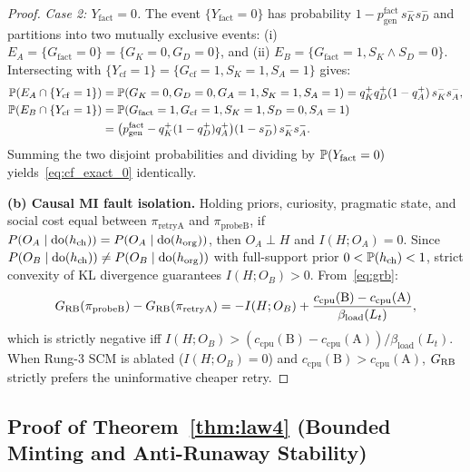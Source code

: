 \begin{proof}
\emph{Case 2: $Y_{\mathrm{fact}} = 0$.} The event $\{Y_{\mathrm{fact}} = 0\}$ has probability $1 - p_{\mathrm{gen}}^{\mathrm{fact}}\, s_K^- s_D^-$ and partitions into two mutually exclusive events:
(i) $E_A = \{G_{\mathrm{fact}} = 0\} = \{G_K = 0, G_D = 0\}$, and
(ii) $E_B = \{G_{\mathrm{fact}} = 1, S_K \land S_D = 0\}$.
Intersecting with $\{Y_{\mathrm{cf}} = 1\} = \{G_{\mathrm{cf}} = 1, S_K = 1, S_A = 1\}$ gives:
\begin{align*}
  \mathbb{P}(E_A \cap \{Y_{\mathrm{cf}}=1\}) &= \mathbb{P}(G_K=0, G_D=0, G_A=1, S_K=1, S_A=1) = q_K^+ q_D^+ (1 - q_A^+)\, s_K^- s_A^-,\\
  \mathbb{P}(E_B \cap \{Y_{\mathrm{cf}}=1\}) &= \mathbb{P}(G_{\mathrm{fact}}=1, G_{\mathrm{cf}}=1, S_K=1, S_D=0, S_A=1)\\
  &= \big(p_{\mathrm{gen}}^{\mathrm{fact}} - q_K^+(1-q_D^+)q_A^+\big)(1 - s_D^-)\, s_K^- s_A^-.
\end{align*}
Summing the two disjoint probabilities and dividing by $\mathbb{P}(Y_{\mathrm{fact}} = 0)$ yields~\eqref{eq:cf_exact_0} identically.

\textbf{(b) Causal MI fault isolation.}
Holding priors, curiosity, pragmatic state, and social cost equal between $\pi_{\mathrm{retryA}}$ and $\pi_{\mathrm{probeB}}$, if $P(O_A \mid \operatorname{do}(h_{\mathrm{ch}})) = P(O_A \mid \operatorname{do}(h_{\mathrm{org}}))$, then $O_A \perp H$ and $I(H; O_A) = 0$. Since $P(O_B \mid \operatorname{do}(h_{\mathrm{ch}})) \neq P(O_B \mid \operatorname{do}(h_{\mathrm{org}}))$ with full-support prior $0 < \mathbb{P}(h_{\mathrm{ch}}) < 1$, strict convexity of KL divergence guarantees $I(H; O_B) > 0$. From~\eqref{eq:grb}:
\[
  G_{\mathrm{RB}}(\pi_{\mathrm{probeB}}) - G_{\mathrm{RB}}(\pi_{\mathrm{retryA}}) = -I(H; O_B) + \frac{c_{\mathrm{cpu}}(\mathrm{B}) - c_{\mathrm{cpu}}(\mathrm{A})}{\beta_{\mathrm{load}}(L_t)},
\]
which is strictly negative iff $I(H; O_B) > (c_{\mathrm{cpu}}(\mathrm{B}) - c_{\mathrm{cpu}}(\mathrm{A}))/\beta_{\mathrm{load}}(L_t)$. When Rung-3 SCM is ablated ($I(H; O_B) = 0$) and $c_{\mathrm{cpu}}(\mathrm{B}) > c_{\mathrm{cpu}}(\mathrm{A})$, $G_{\mathrm{RB}}$ strictly prefers the uninformative cheaper retry.
\end{proof}

\subsection{Proof of Theorem~\ref{thm:law4} (Bounded Minting and Anti-Runaway Stability)}
\label{app:proof4}

